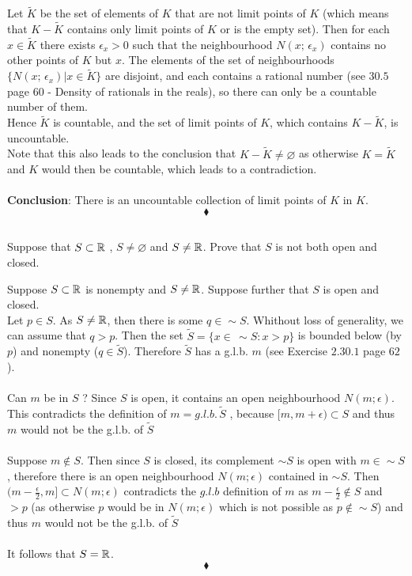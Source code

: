 Let $\tilde{K}$ be the set of elements of $K$ that are not limit points of $K$ (which means that $K-\tilde{K}$ contains only limit points of  $K$ or is the empty set). Then for each $x \in \tilde{K}$ there exists $\epsilon_x > 0$ such that the neighbourhood $N(x;\,\epsilon_x)$ contains no other points of $K$ but $x$. The elements of the set of neighbourhoods $\{N(x;\,\epsilon_x) | x\in \tilde{K}\}$ are disjoint, and each contains a rational number (see $\mathbf{30.5}$ page $60$ - Density of rationals in the reals), so there can only be a countable number of them.\\
Hence $\tilde{K}$ is countable, and the set of limit points of $K$, which contains $K-\tilde{K}$, is uncountable.\\
Note that this also leads to the conclusion that $K-\tilde{K}\neq \varnothing$ as otherwise $K=\tilde{K}$ and $K$ would then be countable, which leads to a contradiction.\\\\
\textbf{Conclusion}: There is an uncountable collection of limit points of $K$ in $K$.
$$\blacklozenge$$

\newpage

\renewcommand{\thesubsection}{\thesection.\RomanNumeralCaps{2}}



 \subsection{}
\begin{tcolorbox}
Suppose that $S\subset \mathbb{R}$ , $S\neq \varnothing$ and $S\neq \mathbb{R}$. Prove that $S$ is not both open and closed.
\end{tcolorbox}
Suppose $S \subset \mathbb{R}$ is nonempty and $S\neq \mathbb{R}$. Suppose further that $S$ is open and closed.\\ Let $p \in S$.  As $S \neq \mathbb{R}$, then there is some $q \in \sim S$.  Whithout loss of generality,  we can assume that $q > p$. Then the set $\tilde{S} = \{ x \in\, \sim S : x > p \}$ is bounded below (by $p$) and nonempty ($q \in \tilde S$). Therefore $\tilde{S}$ has a g.l.b. $m$ (see Exercise $2.30.1$ page $62$).\\\\
Can $m$ be in $S$ ?  Since $S$ is open, it contains an open neighbourhood $N(m;\epsilon)$. This contradicts the definition of $m = g.l.b. \, \tilde S$ , because $[m, m + \epsilon) \subset S$ and thus $m$ would not be the g.l.b. of $\tilde S$ \\\\
Suppose $m \not \in S$. Then since $S$ is closed, its complement $\sim S$ is open with $m\in\sim S $, therefore there is an open neighbourhood $N(m;\epsilon)$ contained in $\sim S$. Then $(m - \frac{\epsilon}{2},m]\subset N(m;\epsilon)$ contradicts the $g.l.b$ definition of $m$ as $m-\frac{\epsilon}{2}\not \in S$ and $> p$ (as otherwise $p$ would be in $N(m;\epsilon)$ which is not possible as $p\not\in \sim S$) and thus $m$ would not be the g.l.b. of $\tilde S$\\\\
It follows that $S = \mathbb{R}$.
$$\blacklozenge$$


